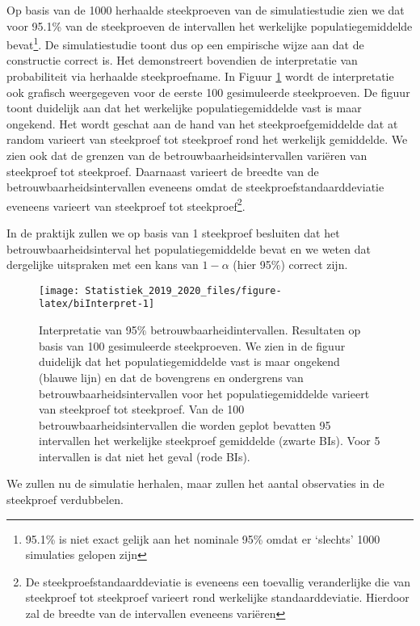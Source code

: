 \documentclass[12pt,dutch,coursenotes]{book}
\let\rmarkdownfootnote\footnote%
\def\footnote{\protect\rmarkdownfootnote}
\theoremstyle{definition}
\theoremstyle{definition}
\theoremstyle{definition}
\theoremstyle{remark}
\begin{document}
Op basis van de 1000 herhaalde steekproeven van de simulatiestudie zien
we dat voor 95.1\% van de steekproeven de intervallen het werkelijke
populatiegemiddelde bevat\footnote{95.1\% is niet exact gelijk aan het
  nominale 95\% omdat er `slechts' 1000 simulaties gelopen zijn}. De
simulatiestudie toont dus op een empirische wijze aan dat de constructie
correct is. Het demonstreert bovendien de interpretatie van
probabiliteit via herhaalde steekproefname. In Figuur
\ref{fig:biInterpret} wordt de interpretatie ook grafisch weergegeven
voor de eerste 100 gesimuleerde steekproeven. De figuur toont duidelijk
aan dat het werkelijke populatiegemiddelde vast is maar ongekend. Het
wordt geschat aan de hand van het steekproefgemiddelde dat at random
varieert van steekproef tot steekproef rond het werkelijk gemiddelde. We
zien ook dat de grenzen van de betrouwbaarheidsintervallen variëren van
steekproef tot steekproef. Daarnaast varieert de breedte van de
betrouwbaarheidsintervallen eveneens omdat de
steekproefstandaarddeviatie eveneens varieert van steekproef tot
steekproef\footnote{De steekproefstandaarddeviatie is eveneens een
  toevallig veranderlijke die van steekproef tot steekproef varieert
  rond werkelijke standaarddeviatie. Hierdoor zal de breedte van de
  intervallen eveneens variëren}.

In de praktijk zullen we op basis van 1 steekproef besluiten dat het
betrouwbaarheidsinterval het populatiegemiddelde bevat en we weten dat
dergelijke uitspraken met een kans van \(1-\alpha\) (hier 95\%) correct
zijn.

\begin{figure}

{\centering \texttt{[image: Statistiek\_2019\_2020\_files/figure-latex/biInterpret-1]} 

}

\caption{Interpretatie van 95$\%$ betrouwbaarheidintervallen. Resultaten op basis van 100 gesimuleerde steekproeven. We zien in de figuur duidelijk dat het populatiegemiddelde vast is maar ongekend (blauwe lijn) en dat de bovengrens en ondergrens van betrouwbaarheidsintervallen voor het populatiegemiddelde varieert van steekproef tot steekproef. Van de 100 betrouwbaarheidsintervallen die worden geplot bevatten 95 intervallen het werkelijke steekproef gemiddelde (zwarte BIs). Voor 5 intervallen is dat niet het geval (rode BIs).}\label{fig:biInterpret}
\end{figure}

We zullen nu de simulatie herhalen, maar zullen het aantal observaties
in de steekproef verdubbelen.
\end{document}
